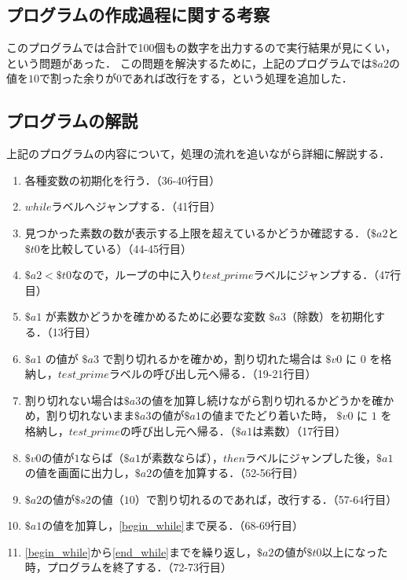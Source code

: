 \documentclass[a4j,11pt]{jarticle}
\begin{document}
\subsection{プログラムの作成過程に関する考察}

このプログラムでは合計で100個もの数字を出力するので実行結果が見にくい，という問題があった．
この問題を解決するために，上記のプログラムでは$\$a2$の値を$10$で割った余りが$0$であれば改行をする，という処理を追加した．

\subsection{プログラムの解説}
上記のプログラムの内容について，処理の流れを追いながら詳細に解説する．

\begin{enumerate}
      \item 各種変数の初期化を行う．（36-40行目）
      \item $while$ラベルへジャンプする．（41行目）
      \item \label{begin_while}見つかった素数の数が表示する上限を超えているかどうか確認する．（$\$a2$と$\$t0$を比較している）（44-45行目）
      \item $\$a2 < \$t0$なので，ループの中に入り$test\_prime$ラベルにジャンプする．（47行目）
      \item $\$a1$ が素数かどうかを確かめるために必要な変数 $\$a3$（除数）を初期化する．（13行目）
      \item $\$a1$ の値が $\$a3$ で割り切れるかを確かめ，割り切れた場合は $\$v0$ に $0$ を格納し，$test\_prime$ラベルの呼び出し元へ帰る．（19-21行目）
      \item 割り切れない場合は$\$a3$の値を加算し続けながら割り切れるかどうかを確かめ，割り切れないまま$\$a3$の値が$\$a1$の値までたどり着いた時，
      $\$v0$ に $1$ を格納し，$test\_prime$の呼び出し元へ帰る．（$\$a1$は素数）（17行目）
      \item $\$v0$の値が$1$ならば（$\$a1$が素数ならば），$then$ラベルにジャンプした後，$\$a1$の値を画面に出力し，$\$a2$の値を加算する．（52-56行目）
      \item $\$a2$の値が$\$s2$の値（$10$）で割り切れるのであれば，改行する．（57-64行目）
      \item \label{end_while}$\$a1$の値を加算し，\ref{begin_while}まで戻る．（68-69行目）
      \item \ref{begin_while}から\ref{end_while}までを繰り返し，$\$a2$の値が$\$t0$以上になった時，プログラムを終了する．（72-73行目）
\end{enumerate}
\end{document}
